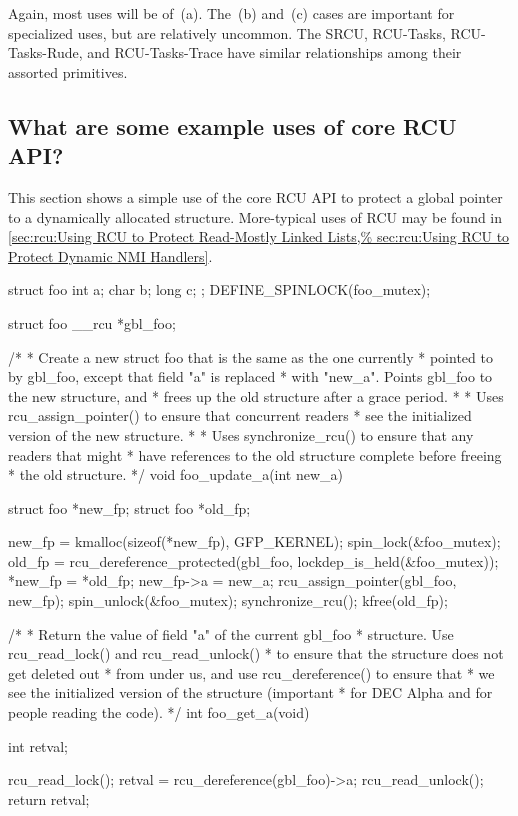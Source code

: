 Again, most uses will be of~(a).
The~(b) and~(c) cases are important
for specialized uses, but are relatively uncommon.
The SRCU, RCU-Tasks, RCU-Tasks-Rude, and RCU-Tasks-Trace have similar relationships among
their assorted primitives.

\subsection{What are some example uses of core RCU API?}
\label{sec:rcu:What are some example uses of core RCU API?}

This section shows a simple use of the core RCU API to protect a
global pointer to a dynamically allocated structure.
More-typical
uses of RCU may be found in
\cref{sec:rcu:Using RCU to Protect Read-Mostly Linked Lists,%
sec:rcu:Using RCU to Protect Dynamic NMI Handlers}.

\begin{VerbatimU}[samepage=false,breaklines=true]
	struct foo {
		int a;
		char b;
		long c;
	};
	DEFINE_SPINLOCK(foo_mutex);

	struct foo __rcu *gbl_foo;

	/*
	 * Create a new struct foo that is the same as the one currently
	 * pointed to by gbl_foo, except that field "a" is replaced
	 * with "new_a".  Points gbl_foo to the new structure, and
	 * frees up the old structure after a grace period.
	 *
	 * Uses rcu_assign_pointer() to ensure that concurrent readers
	 * see the initialized version of the new structure.
	 *
	 * Uses synchronize_rcu() to ensure that any readers that might
	 * have references to the old structure complete before freeing
	 * the old structure.
	 */
	void foo_update_a(int new_a)
	{
		struct foo *new_fp;
		struct foo *old_fp;

		new_fp = kmalloc(sizeof(*new_fp), GFP_KERNEL);
		spin_lock(&foo_mutex);
		old_fp = rcu_dereference_protected(gbl_foo, lockdep_is_held(&foo_mutex));
		*new_fp = *old_fp;
		new_fp->a = new_a;
		rcu_assign_pointer(gbl_foo, new_fp);
		spin_unlock(&foo_mutex);
		synchronize_rcu();
		kfree(old_fp);
	}

	/*
	 * Return the value of field "a" of the current gbl_foo
	 * structure.  Use rcu_read_lock() and rcu_read_unlock()
	 * to ensure that the structure does not get deleted out
	 * from under us, and use rcu_dereference() to ensure that
	 * we see the initialized version of the structure (important
	 * for DEC Alpha and for people reading the code).
	 */
	int foo_get_a(void)
	{
		int retval;

		rcu_read_lock();
		retval = rcu_dereference(gbl_foo)->a;
		rcu_read_unlock();
		return retval;
	}
\end{VerbatimU}

